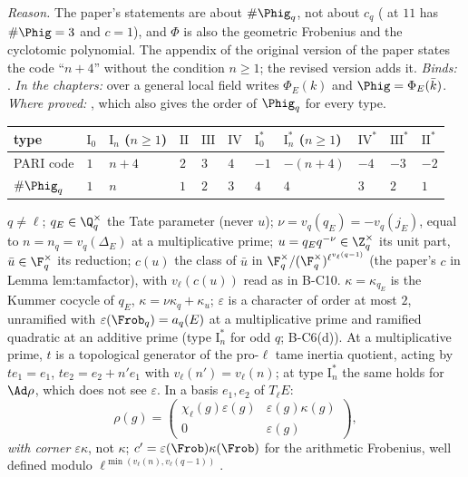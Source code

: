 \noindent\emph{Reason.} The paper's statements are about $\#\Phig_q$, not about $c_q$ ( at $11$ has $\#\Phig=3$ and
$c=1$), and $\Phi$ is also the geometric Frobenius and the cyclotomic polynomial. The appendix of the original version of the paper states
the code ``$n+4$'' without the condition $n\ge1$; the revised version adds it. \emph{Binds:} .
\emph{In the chapters:} over a general local field  writes $\Phi_E(k)$ and $\Phig=\Phi_E(\bar k)$.
\emph{Where proved:} , which also gives the order of $\Phig_q$ for every type.

\begin{center}\small
\begin{tabular}{@{}lllllllllll@{}}
\toprule
type & $\mathrm I_0$ & $\mathrm I_n$ ($n\ge1$) & $\mathrm{II}$ & $\mathrm{III}$ & $\mathrm{IV}$ & $\mathrm I_0^*$ & $\mathrm I_n^*$ ($n\ge1$) & $\mathrm{IV}^*$ & $\mathrm{III}^*$ & $\mathrm{II}^*$\\
\midrule
PARI code & $1$ & $n+4$ & $2$ & $3$ & $4$ & $-1$ & $-(n+4)$ & $-4$ & $-3$ & $-2$\\
$\#\Phig_q$ & $1$ & $n$ & $1$ & $2$ & $3$ & $4$ & $4$ & $3$ & $2$ & $1$\\
\bottomrule
\end{tabular}
\end{center}

\begin{convention}\label{conv:notation:bc14}
$q\ne\ell$; $q_E\in\Q_q^\times$ the Tate parameter (never $u$); $\nu=v_q(q_E)=-v_q(j_E)$, equal to $n=n_q=v_q(\Delta_E)$ at a
multiplicative prime; $u=q_Eq^{-\nu}\in\Z_q^\times$ its unit part, $\bar u\in\F_q^\times$ its reduction; $c(u)$ the class of $\bar u$ in
$\F_q^\times/(\F_q^\times)^{\ell^{v_\ell(q-1)}}$ (the paper's $c$ in Lemma lem:tamfactor), with $v_\ell(c(u))$ read as in B-C10.
$\kappa=\kappa_{q_E}$ is the Kummer cocycle of $q_E$, $\kappa=\nu\kappa_q+\kappa_u$; $\varepsilon$ is a character of order at most $2$, unramified with
$\varepsilon(\Frob_q)=a_q(E)$ at a multiplicative prime and ramified quadratic at an additive prime (type $\mathrm I_n^*$ for odd $q$; B-C6(d)). At
a multiplicative prime, $t$ is a topological generator of the pro-$\ell$ tame inertia quotient, acting by $te_1=e_1$, $te_2=e_2+n'e_1$ with
$v_\ell(n')=v_\ell(n)$; at type $\mathrm I_n^*$ the same holds for $\Ad\rho$, which does not see $\varepsilon$. In a basis $e_1,e_2$ of $T_\ell E$:
\[
\rho(g)=\begin{pmatrix}\chi_\ell(g)\varepsilon(g)&\varepsilon(g)\kappa(g)\\0&\varepsilon(g)\end{pmatrix},
\]
\emph{with corner $\varepsilon\kappa$}, not $\kappa$; $c'=\varepsilon(\Frob)\kappa(\Frob)$ for the arithmetic Frobenius, well defined modulo
$\ell^{\min(v_\ell(n),v_\ell(q-1))}$.
\end{convention}

